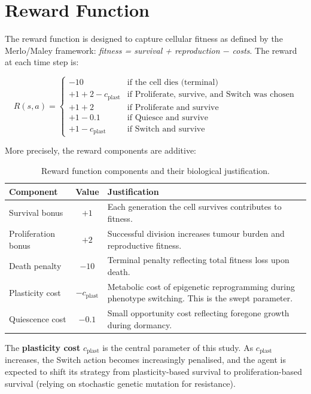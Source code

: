 \documentclass[12pt,a4paper]{article}
\begin{document}
\section{Reward Function}

The reward function is designed to capture cellular fitness as defined by the Merlo/Maley framework: \emph{fitness = survival + reproduction $-$ costs}. The reward at each time step is:

\[
R(s, a) = \begin{cases}
    -10 & \text{if the cell dies (terminal)} \\
    +1 + 2 - c_{\text{plast}} & \text{if Proliferate, survive, and Switch was chosen} \\
    +1 + 2 & \text{if Proliferate and survive} \\
    +1 - 0.1 & \text{if Quiesce and survive} \\
    +1 - c_{\text{plast}} & \text{if Switch and survive}
\end{cases}
\]

More precisely, the reward components are additive:

\begin{table}[H]
\centering
\caption{Reward function components and their biological justification.}
\label{tab:reward}
\begin{tabular}{lcp{7cm}}
\toprule
\textbf{Component} & \textbf{Value} & \textbf{Justification} \\
\midrule
Survival bonus      & $+1$   & Each generation the cell survives contributes to fitness. \\
Proliferation bonus & $+2$   & Successful division increases tumour burden and reproductive fitness. \\
Death penalty       & $-10$  & Terminal penalty reflecting total fitness loss upon death. \\
Plasticity cost     & $-c_{\text{plast}}$ & Metabolic cost of epigenetic reprogramming during phenotype switching. This is the swept parameter. \\
Quiescence cost     & $-0.1$ & Small opportunity cost reflecting foregone growth during dormancy. \\
\bottomrule
\end{tabular}
\end{table}

The \textbf{plasticity cost} $c_{\text{plast}}$ is the central parameter of this study. As $c_{\text{plast}}$ increases, the Switch action becomes increasingly penalised, and the agent is expected to shift its strategy from plasticity-based survival to proliferation-based survival (relying on stochastic genetic mutation for resistance).
\end{document}

